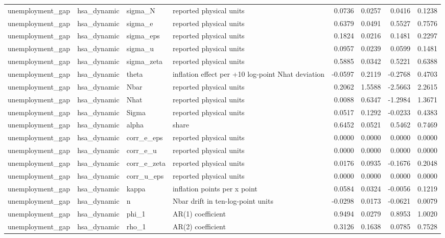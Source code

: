 \begin{tabular}{llllrrrr}
unemployment\_gap & hsa\_dynamic & sigma\_N & reported physical units & 0.0736 & 0.0257 & 0.0416 & 0.1238 \\
unemployment\_gap & hsa\_dynamic & sigma\_e & reported physical units & 0.6379 & 0.0491 & 0.5527 & 0.7576 \\
unemployment\_gap & hsa\_dynamic & sigma\_eps & reported physical units & 0.1824 & 0.0216 & 0.1481 & 0.2297 \\
unemployment\_gap & hsa\_dynamic & sigma\_u & reported physical units & 0.0957 & 0.0239 & 0.0599 & 0.1481 \\
unemployment\_gap & hsa\_dynamic & sigma\_zeta & reported physical units & 0.5885 & 0.0342 & 0.5221 & 0.6388 \\
unemployment\_gap & hsa\_dynamic & theta & inflation effect per +10 log-point Nhat deviation & -0.0597 & 0.2119 & -0.2768 & 0.4703 \\
unemployment\_gap & hsa\_dynamic & Nbar & reported physical units & 0.2062 & 1.5588 & -2.5663 & 2.2615 \\
unemployment\_gap & hsa\_dynamic & Nhat & reported physical units & 0.0088 & 0.6347 & -1.2984 & 1.3671 \\
unemployment\_gap & hsa\_dynamic & Sigma & reported physical units & 0.0517 & 0.1292 & -0.0233 & 0.4383 \\
unemployment\_gap & hsa\_dynamic & alpha & share & 0.6452 & 0.0521 & 0.5462 & 0.7469 \\
unemployment\_gap & hsa\_dynamic & corr\_e\_eps & reported physical units & 0.0000 & 0.0000 & 0.0000 & 0.0000 \\
unemployment\_gap & hsa\_dynamic & corr\_e\_u & reported physical units & 0.0000 & 0.0000 & 0.0000 & 0.0000 \\
unemployment\_gap & hsa\_dynamic & corr\_e\_zeta & reported physical units & 0.0176 & 0.0935 & -0.1676 & 0.2048 \\
unemployment\_gap & hsa\_dynamic & corr\_u\_eps & reported physical units & 0.0000 & 0.0000 & 0.0000 & 0.0000 \\
unemployment\_gap & hsa\_dynamic & kappa & inflation points per x point & 0.0584 & 0.0324 & -0.0056 & 0.1219 \\
unemployment\_gap & hsa\_dynamic & n & Nbar drift in ten-log-point units & -0.0298 & 0.0173 & -0.0621 & 0.0079 \\
unemployment\_gap & hsa\_dynamic & phi\_1 & AR(1) coefficient & 0.9494 & 0.0279 & 0.8953 & 1.0020 \\
unemployment\_gap & hsa\_dynamic & rho\_1 & AR(2) coefficient & 0.3126 & 0.1638 & 0.0785 & 0.7528 \\

\end{tabular}
